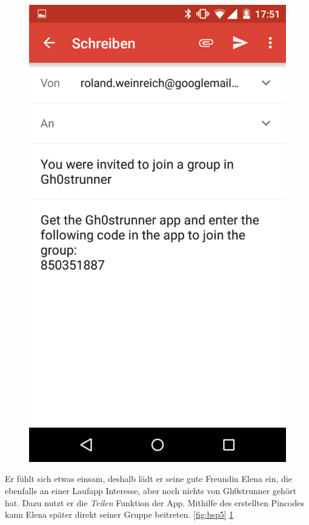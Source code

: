 \begin{figure}[!h]
\begin{minipage}{.4\textwidth}
  \includegraphics[width=.8\linewidth]{abb/bsp/bsp6}
  \label{fig:bsp6}
\end{minipage}
\end{figure}

Er fühlt sich etwas einsam, deshalb lädt er seine gute Freundin Elena ein, die ebenfalls an einer Laufapp Interesse, aber noch nichts von Gh0strunner gehört hat. Dazu nutzt er die \textit{Teilen} Funktion der App. Mithilfe des erstellten Pincodes kann Elena später direkt seiner Gruppe beitreten. \ref{fig:bsp5} \ref{fig:bsp6}

